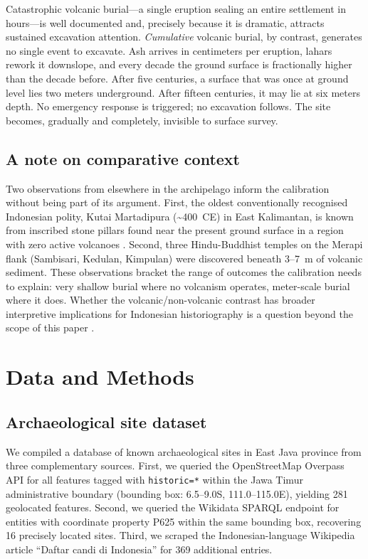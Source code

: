 \documentclass[12pt,a4paper]{article}
\begin{document}
Catastrophic volcanic burial---a single eruption sealing an entire settlement in hours---is well documented \citep{sigurdsson1985,doumas1983,sheets1992} and, precisely because it is dramatic, attracts sustained excavation attention. \textit{Cumulative} volcanic burial, by contrast, generates no single event to excavate. Ash arrives in centimeters per eruption, lahars rework it downslope, and every decade the ground surface is fractionally higher than the decade before. After five centuries, a surface that was once at ground level lies two meters underground. After fifteen centuries, it may lie at six meters depth. No emergency response is triggered; no excavation follows. The site becomes, gradually and completely, invisible to surface survey.

\subsection{A note on comparative context}

Two observations from elsewhere in the archipelago inform the calibration without being part of its argument. First, the oldest conventionally recognised Indonesian polity, Kutai Martadipura (\textasciitilde400~CE) in East Kalimantan, is known from inscribed stone pillars found near the present ground surface in a region with zero active volcanoes \citep{vogel1918,coedes1968,miksic2004}. Second, three Hindu-Buddhist temples on the Merapi flank (Sambisari, Kedulan, Kimpulan) were discovered beneath 3--7~m of volcanic sediment. These observations bracket the range of outcomes the calibration needs to explain: very shallow burial where no volcanism operates, meter-scale burial where it does. Whether the volcanic/non-volcanic contrast has broader interpretive implications for Indonesian historiography is a question beyond the scope of this paper \citep[see][]{amien_synthesis_forthcoming}.


\section{Data and Methods}

\subsection{Archaeological site dataset}

We compiled a database of known archaeological sites in East Java province from three complementary sources. First, we queried the OpenStreetMap Overpass API for all features tagged with \texttt{historic=*} within the Jawa Timur administrative boundary (bounding box: 6.5--9.0\textdegree{}S, 111.0--115.0\textdegree{}E), yielding 281 geolocated features. Second, we queried the Wikidata SPARQL endpoint for entities with coordinate property P625 within the same bounding box, recovering 16 precisely located sites. Third, we scraped the Indonesian-language Wikipedia article ``Daftar candi di Indonesia'' for 369 additional entries.
\end{document}
